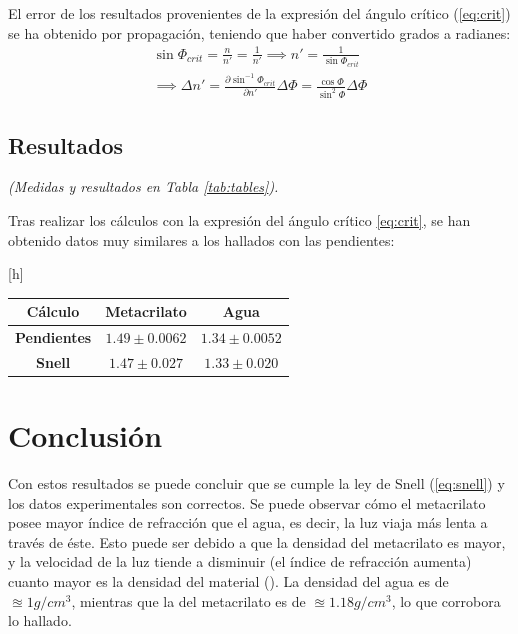 \documentclass[fleqn,usenatbib,openbib]{mnras}
\makeatletter
\renewenvironment{table}[1][]{%
    \@float{table}[#1]%
}{%
    \end@float
}
\makeatother
\begin{document}
El error de los resultados provenientes de la expresión del ángulo crítico (\ref{eq:crit}) se ha obtenido por propagación, teniendo que haber convertido grados a radianes:
\begin{gather*}
    \sin\Phi_{crit}=\frac{n}{n'}=\frac{1}{n'}\implies n'=\frac{1}{\sin\Phi_{crit}}\\
    \implies \Delta n' = \frac{\partial \sin^{-1}\Phi_{crit}}{\partial n'}\Delta\Phi = \frac{\cos\Phi}{\sin^2\Phi}\Delta\Phi
\end{gather*}

\subsection{Resultados}
\label{resultados}

\textit{(Medidas y resultados en Tabla \ref{tab:tables}).}

Tras realizar los cálculos con la expresión del ángulo crítico \ref{eq:crit}, se han obtenido datos muy similares a los hallados con las pendientes:

\begin{table}[h]
    \centering
    \begin{tabular}{ccc}
        \hline
        Cálculo & Metacrilato & Agua \\
        \hline
        \textbf{Pendientes} & $1.49\pm 0.0062$ & $1.34\pm 0.0052$ \\
        \textbf{Snell} & $1.47\pm 0.027$ & $1.33\pm 0.020$ \\
        \hline
    \end{tabular}
\end{table}

\section{Conclusión}

Con estos resultados se puede concluir que se cumple la ley de Snell (\ref{eq:snell}) y los datos experimentales son correctos. Se puede observar cómo el metacrilato posee mayor índice de refracción que el agua, es decir, la luz viaja más lenta a través de éste. Esto puede ser debido a que la densidad del metacrilato es mayor, y la velocidad de la luz tiende a disminuir (el índice de refracción aumenta) cuanto mayor es la densidad del material (\cite{cant}). La densidad del agua es de $\approxeq 1 g/cm^3$, mientras que la del metacrilato es de $\approxeq 1.18 g/cm^3$, lo que corrobora lo hallado.
\end{document}
